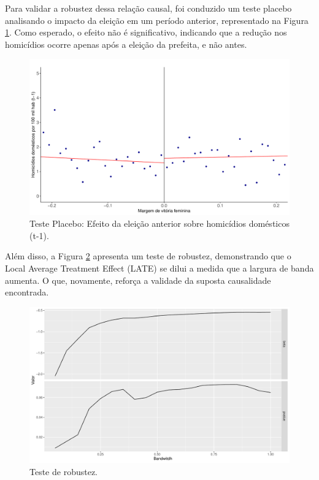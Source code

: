 Para validar a robustez dessa relação causal, foi conduzido um teste placebo analisando o impacto da eleição em um período anterior, representado na Figura \ref{fig:rdd_plot_t_1}. Como esperado, o efeito não é significativo, indicando que a redução nos homicídios ocorre apenas após a eleição da prefeita, e não antes. 

\begin{figure}
    \centering
    \includegraphics[width=0.8\linewidth]{relatorios/close_elections/graficos/rdd_plot_t_1.pdf}
    \caption{Teste Placebo: Efeito da eleição anterior sobre homicídios domésticos (t-1).}
    \label{fig:rdd_plot_t_1}
\end{figure}

Além disso, a Figura \ref{fig:robustez} apresenta um teste de robustez, demonstrando que o Local Average Treatment Effect (LATE) se dilui a medida que a largura de banda aumenta. O que, novamente, reforça a validade da suposta causalidade encontrada.  


\begin{figure}
    \centering
    \includegraphics[width=0.8\linewidth]{relatorios/close_elections/graficos/robustez.pdf}
    \caption{Teste de robustez.}
    \label{fig:robustez}
\end{figure}

